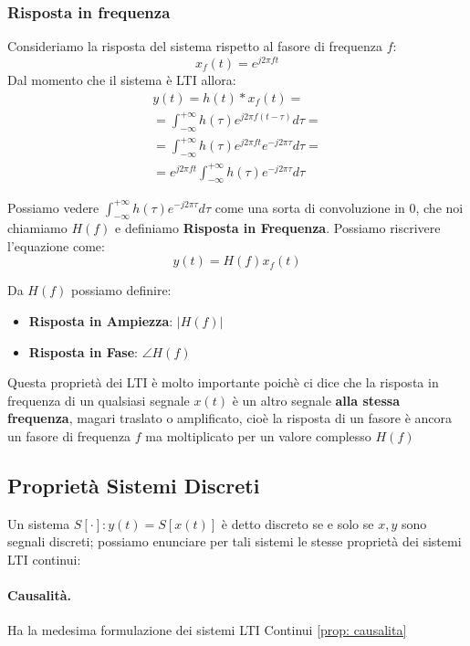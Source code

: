 \subsubsection{Risposta in frequenza}
Consideriamo la risposta del sistema rispetto al fasore di frequenza $f$:
\begin{equation*}
    x_f(t) = e^{j2\pi ft}
\end{equation*}
Dal momento che il sistema è LTI allora:
\begin{align*}
    y(t) = h(t) \ast x_f(t) = \\
    = \int_{-\infty}^{+\infty} h(\tau)e^{j2\pi f(t - \tau)} d\tau =\\
    = \int_{-\infty}^{+\infty} h(\tau)e^{j2\pi ft}e^{-j2\pi\tau} d\tau =\\
    = e^{j2\pi ft} \int_{-\infty}^{+\infty} h(\tau) e^{-j2\pi\tau} d\tau 
\end{align*}
\begin{highlightedeq}
    Possiamo vedere $\int_{-\infty}^{+\infty} h(\tau) e^{-j2\pi\tau} d\tau$ come una sorta di convoluzione in 0, che noi chiamiamo $H(f)$ 
    e definiamo \textbf{Risposta in Frequenza}. Possiamo riscrivere l'equazione come:
    \begin{equation}
        y(t) = H(f)x_f(t)
    \end{equation}
\end{highlightedeq}
Da $H(f)$ possiamo definire:
\begin{itemize}
    \item \textbf{Risposta in Ampiezza}: $|H(f)|$
    \item \textbf{Risposta in Fase}: $\angle H(f)$
\end{itemize}
Questa proprietà dei LTI è molto importante poichè ci dice che la risposta in frequenza di un qualsiasi segnale $x(t)$ è un altro segnale \textbf{alla stessa frequenza}, magari traslato o amplificato,
cioè la risposta di un fasore è ancora un fasore di frequenza $f$ ma moltiplicato per un valore complesso $H(f)$



\subsection{Proprietà Sistemi Discreti}
Un sistema $S[\cdot]:y(t) = S[x(t)]$ è detto discreto se e solo se $x,y$ sono segnali discreti; possiamo enunciare per tali sistemi le stesse proprietà dei sistemi LTI continui:
\paragraph{Causalità.}
Ha la medesima formulazione dei sistemi LTI Continui \eqref{prop: causalita} 


